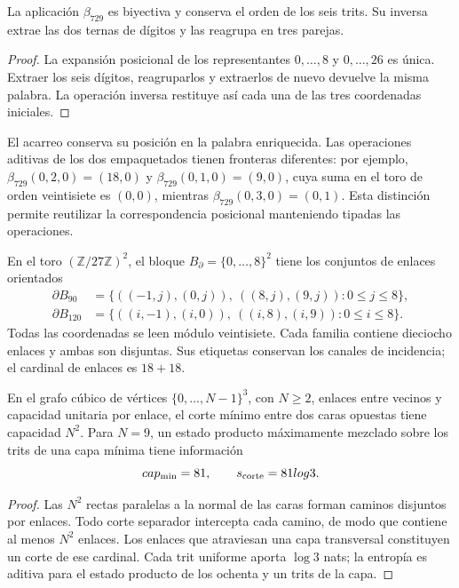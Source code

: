\begin{proposition}
\label{x_reciprocidad:v:ant:prop:ii-area-beta729}
La aplicación \(\beta_{729}\) es biyectiva y conserva el orden de los
seis trits. Su inversa extrae las dos ternas de dígitos y las reagrupa
en tres parejas.
\end{proposition}
\begin{proof}
La expansión posicional de los representantes \(0,\ldots,8\) y
\(0,\ldots,26\) es única. Extraer los seis dígitos, reagruparlos y
extraerlos de nuevo devuelve la misma palabra. La operación inversa
restituye así cada una de las tres coordenadas iniciales.
\end{proof}

El acarreo conserva su posición en la palabra enriquecida. Las operaciones
aditivas de los dos empaquetados tienen fronteras diferentes: por ejemplo,
\(\beta_{729}(0,2,0)=(18,0)\) y
\(\beta_{729}(0,1,0)=(9,0)\), cuya suma en el toro de orden
veintisiete es \((0,0)\), mientras
\(\beta_{729}(0,3,0)=(0,1)\). Esta distinción permite reutilizar
la correspondencia posicional manteniendo tipadas las operaciones.

En el toro \((\mathbb Z/27\mathbb Z)^2\), el bloque
\(B_\partial=\{0,\ldots,8\}^2\) tiene los conjuntos de enlaces
orientados
\begin{align}
 \partial B_{90}
 &=\{((-1,j),(0,j)),\ ((8,j),(9,j)):0\le j\le8\},\\
 \partial B_{120}
 &=\{((i,-1),(i,0)),\ ((i,8),(i,9)):0\le i\le8\}.
 \label{x_reciprocidad:v:ant:eq:ii-area-enlaces}
\end{align}
Todas las coordenadas se leen módulo veintisiete. Cada familia contiene
dieciocho enlaces y ambas son disjuntas. Sus etiquetas conservan los
canales de incidencia; el cardinal de enlaces es \(18+18\).

\begin{theorem}
\label{x_reciprocidad:v:ant:thm:ii-area-corte-minimo}
En el grafo cúbico de vértices \(\{0,\ldots,N-1\}^3\), con
\(N\ge2\), enlaces entre vecinos y capacidad unitaria por enlace,
el corte mínimo entre dos caras opuestas tiene capacidad \(N^2\).
Para \(N=9\), un estado producto máximamente mezclado sobre los
trits de una capa mínima tiene información
\begin{equation}
 \operatorname{cap}_{\min}=81,\qquad s_{\rm corte}=81\log3.
 \label{x_reciprocidad:v:ant:eq:ii-area-corte-informacion}
\end{equation}
\end{theorem}
\begin{proof}
Las \(N^2\) rectas paralelas a la normal de las caras forman caminos
disjuntos por enlaces. Todo corte separador intercepta cada camino, de
modo que contiene al menos \(N^2\) enlaces. Los enlaces que atraviesan
una capa transversal constituyen un corte de ese cardinal. Cada trit
uniforme aporta \(\log3\) nats; la entropía es aditiva para el estado
producto de los ochenta y un trits de la capa.
\end{proof}

